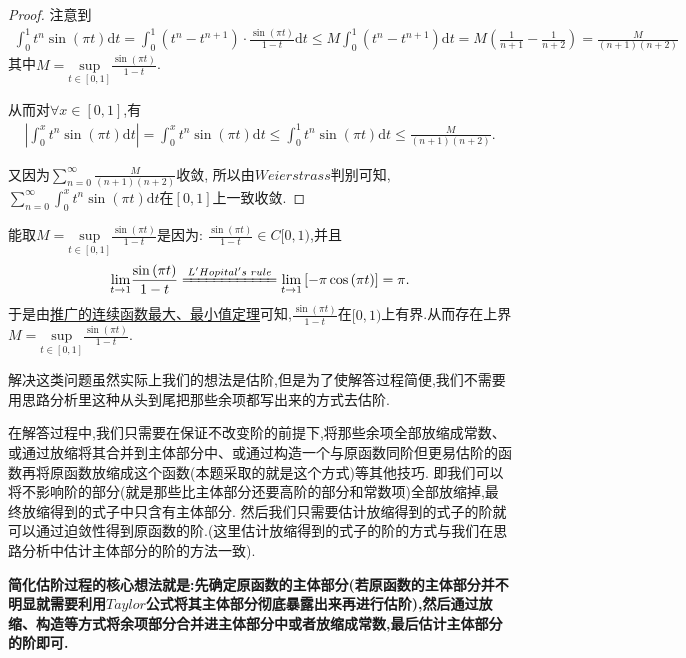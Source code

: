 \documentclass[lang=cn,newtx,10pt,scheme=chinese]{../Template/elegantbook}
\begin{document}
\begin{proof}

{\color{blue}}
注意到\begin{align*}
\int_0^1{t^n\sin \left( \pi t \right) \mathrm{d}t}=\int_0^1{ \left( t^n-t^{n+1} \right) \cdot \frac{\sin \left( \pi t \right)}{1-t}  \mathrm{d}t}\leqslant M\int_0^1{\left( t^n-t^{n+1} \right)}\mathrm{d}t=M\left( \frac{1}{n+1}-\frac{1}{n+2} \right) =\frac{M}{\left( n+1 \right) \left( n+2 \right)}
\end{align*}
其中$M=\underset{t\in \left[ 0,1 \right]}{\mathrm{sup}}\frac{\sin \left( \pi t \right)}{1-t}$.

从而对$\forall x\in[0,1]$,有\begin{align*}
\left| \int_0^x{t^n\sin \left( \pi t \right) \mathrm{d}t} \right|=\int_0^x{t^n\sin \left( \pi t \right) \mathrm{d}t}\leqslant \int_0^1{t^n\sin \left( \pi t \right) \mathrm{d}t}\leqslant \frac{M}{\left( n+1 \right) \left( n+2 \right)}.
\end{align*}



又因为$\sum_{n=0}^{\infty}{\frac{M}{\left( n+1 \right) \left( n+2 \right)}}$收敛,
所以由$Weierstrass$判别可知,$\sum_{n=0}^{\infty}{\int_0^x{t^n\sin \left( \pi t \right) \mathrm{d}t}}$在$\left[ 0,1 \right] $上一致收敛.

\end{proof}
\begin{remark}
能取$M=\underset{t\in \left[ 0,1 \right]}{\mathrm{sup}}\frac{\sin \left( \pi t \right)}{1-t}$是因为:
$\frac{\sin \left( \pi t \right)}{1-t}\in C[0,1)$,并且
\begin{align*}
\underset{t\rightarrow 1}{\lim}\frac{\sin \left( \pi t \right)}{1-t}\xlongequal{L'Hopital's\,\,rule}\underset{t\rightarrow 1}{\lim}\left[ -\pi \cos \left( \pi t \right) \right] =\pi .
\end{align*}
于是由\hyperlink{label}{推广的连续函数最大、最小值定理}可知,$\frac{\sin \left( \pi t \right)}{1-t}$在$[0,1)$上有界.从而存在上界$M=\underset{t\in \left[ 0,1 \right]}{\mathrm{sup}}\frac{\sin \left( \pi t \right)}{1-t}$.
\end{remark}
\begin{remark}
解决这类问题虽然实际上我们的想法是估阶,但是为了使解答过程简便,我们不需要用思路分析里这种从头到尾把那些余项都写出来的方式去估阶.

在解答过程中,我们只需要在保证不改变阶的前提下,将那些余项全部放缩成常数、或通过放缩将其合并到主体部分中、或通过构造一个与原函数同阶但更易估阶的函数再将原函数放缩成这个函数(本题采取的就是这个方式)等其他技巧.
即我们可以将不影响阶的部分(就是那些比主体部分还要高阶的部分和常数项)全部放缩掉,最终放缩得到的式子中只含有主体部分.
然后我们只需要估计放缩得到的式子的阶就可以通过迫敛性得到原函数的阶.(这里估计放缩得到的式子的阶的方式与我们在思路分析中估计主体部分的阶的方法一致).
\end{remark}
\begin{conclusion}\label{简化估阶过程的核心想法}
\textbf{简化估阶过程的核心想法就是:先确定原函数的主体部分(若原函数的主体部分并不明显就需要利用$Taylor$公式将其主体部分彻底暴露出来再进行估阶),然后通过放缩、构造等方式将余项部分合并进主体部分中或者放缩成常数,最后估计主体部分的阶即可.}
\end{conclusion}
\end{document}
